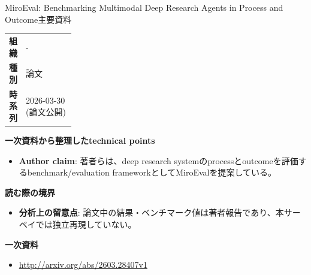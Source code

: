 \begin{technicalnote}{MiroEval: Benchmarking Multimodal Deep Research Agents in Process and Outcome}{主要資料}
\begingroup
\begin{tabularx}{\linewidth}{@{}>{\bfseries}p{0.22\linewidth}X@{}}
組織 & - \\
種別 & 論文 \\
時系列 & 2026-03-30 (論文公開) \\
\end{tabularx}
\smallskip
{\bfseries 一次資料から整理したtechnical points}
\begin{itemize}[leftmargin=1.5em,itemsep=0.35em]
\item \textbf{Author claim}: 著者らは、deep research systemのprocessとoutcomeを評価するbenchmark/evaluation frameworkとしてMiroEvalを提案している。
\end{itemize}
\begin{minipage}{\linewidth}
{\bfseries 読む際の境界}
\begin{itemize}[leftmargin=1.5em,itemsep=0.35em]
\item \textbf{分析上の留意点}: 論文中の結果・ベンチマーク値は著者報告であり、本サーベイでは独立再現していない。
\end{itemize}
\begin{samepage}
{\bfseries 一次資料}
\begingroup\sloppy
\begin{itemize}[leftmargin=1.5em,itemsep=0.25em]
\item {\scriptsize\url{http://arxiv.org/abs/2603.28407v1}}
\end{itemize}
\endgroup
\end{samepage}
\end{minipage}
\endgroup
\end{technicalnote}
\medskip

